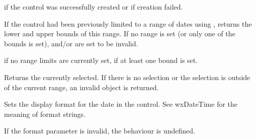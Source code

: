 



\true if the control was successfully created or \false if creation failed.


\label{wxdatepickerctrlgetrange}


If the control had been previously limited to a range of dates using 
, returns the lower and upper
bounds of this range. If no range is set (or only one of the bounds is set),
  and/or  are set to be invalid.





\false if no range limits are currently set, \true if at least one bound is
set.


\label{wxdatepickerctrlgetvalue}


Returns the currently selected. If there is no selection or the selection is
outside of the current range, an invalid object is returned.

\label{wxdatepickerctrlsetformat}


Sets the display format for the date in the control. See wxDateTime for the meaning of format strings.


If the format parameter is invalid,
the behaviour is undefined.


\label{wxdatepickerctrlsetrange}

